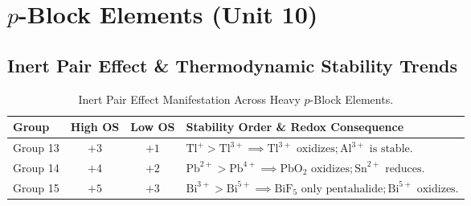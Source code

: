 \documentclass[10pt,twoside,openright]{book}
\begin{document}
\newpage

\section{$p$-Block Elements (Unit 10)}

\subsection{Inert Pair Effect \& Thermodynamic Stability Trends}

\begin{table}[htbp]
\centering
\small
\renewcommand{\arraystretch}{1.2}
{\fontsize{7.5pt}{9.0pt}\selectfont\setlength{\tabcolsep}{1.5pt}
\begin{tabularx}{\linewidth}{l c c >{\RaggedRight}X}
\toprule
\textbf{Group} & \textbf{High OS} & \textbf{Low OS} & \textbf{Stability Order \& Redox Consequence} \\
\midrule
Group 13 & $+3$ & $+1$ & $\text{Tl}^+ > \text{Tl}^{3+} \implies \text{Tl}^{3+} \text{ oxidizes}; \text{Al}^{3+} \text{ is stable.}$ \\
Group 14 & $+4$ & $+2$ & $\text{Pb}^{2+} > \text{Pb}^{4+} \implies \text{PbO}_2 \text{ oxidizes}; \text{Sn}^{2+} \text{ reduces.}$ \\
Group 15 & $+5$ & $+3$ & $\text{Bi}^{3+} > \text{Bi}^{5+} \implies \text{BiF}_5 \text{ only pentahalide}; \text{Bi}^{5+} \text{ oxidizes.}$ \\
\bottomrule
\end{tabularx}}
\caption{Inert Pair Effect Manifestation Across Heavy $p$-Block Elements.}
\end{table}
\end{document}
